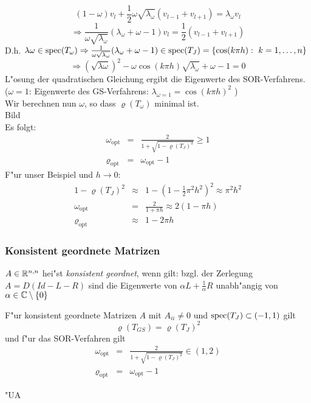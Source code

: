 \documentclass{scrartcl}
\begin{document}
\begin{1aufz}
$$(1 - \omega) v_l + \frac{1}{2} \omega \sqrt{\lambda_\omega} (v_{l-1} + v_{l+1}) = \lambda_\omega v_l$$
$$\Rightarrow \frac{1}{\omega \sqrt{\lambda_\omega}} (\lambda_\omega + \omega - 1) v_l = \frac{1}{2} (v_{l-1} + v_{l+1})$$
D.h. $\lambda \omega \in \mathrm{spec}( T_\omega ) \Rightarrow \frac{1}{\omega \sqrt{\lambda_\omega}} (\lambda_\omega + \omega - 1) \in \mathrm{spec}(T_J) = \{ \cos(k \pi h): \ k=1, \ldots, n \}$ \\
$$\Rightarrow (\sqrt{\lambda \omega})^2 - \omega \cos(k \pi h) \sqrt{\lambda_\omega} + \omega - 1 =0$$
L"osung der quadratischen Gleichung ergibt die Eigenwerte des SOR-Verfahrens. \\
($\omega = 1$: Eigenwerte des GS-Verfahrens: $\lambda_{\omega=1} = \cos(k \pi h)^2$ ) \\
Wir berechnen nun $\omega$, so dass $\varrho(T_\omega)$ minimal ist. \\
Bild \\
Es folgt:
\begin{eqnarray*}
\omega_\mathrm{opt} & = & \frac{2}{1 + \sqrt{1- \varrho(T_J)^2}} \geq 1 \\
\varrho_\mathrm{opt} & = & \omega_\mathrm{opt} -1
\end{eqnarray*}
F"ur unser Beispiel und $h \rightarrow 0$:
\begin{eqnarray*}
1 - \varrho(T_J)^2 & \approx & 1- (1- \frac{1}{2} \pi^2 h^2)^2 \approx \pi^2 h^2 \\
\omega_\mathrm{opt} & = & \frac{2}{1+ \pi h} \approx 2(1 - \pi h) \\
\varrho_\mathrm{opt} & \approx & 1 - 2 \pi h
\end{eqnarray*}
\end{1aufz}

\subsubsection{Konsistent geordnete Matrizen}
\begin{Def}
$A \in \mathbb{R}^{n,n}$ hei"st \emph{konsistent geordnet}, wenn gilt: bzgl. der Zerlegung $A = D(Id - L - R)$ sind die Eigenwerte von $\alpha L + \frac{1}{\alpha}R$ unabh"angig von $\alpha \in \mathbb{C} \setminus \{ 0 \}$
\end{Def}

\begin{Satz}
F"ur konsistent geordnete Matrizen $A$ mit $A_{ii} \neq 0$ und $\mathrm{spec}(T_J) \subset (-1,1)$ gilt
$$\varrho( T_{GS} ) = \varrho (T_J)^2$$
und f"ur das SOR-Verfahren gilt
\begin{eqnarray*}
\omega_\mathrm{opt} & = & \frac{2}{1 + \sqrt{1 - \varrho(T_J)^2}} \in (1,2) \\
\varrho_\mathrm{opt} & = & \omega_\mathrm{opt} - 1
\end{eqnarray*}
\end{Satz}
\begin{Bew}
"UA
\end{Bew}
\end{document}
